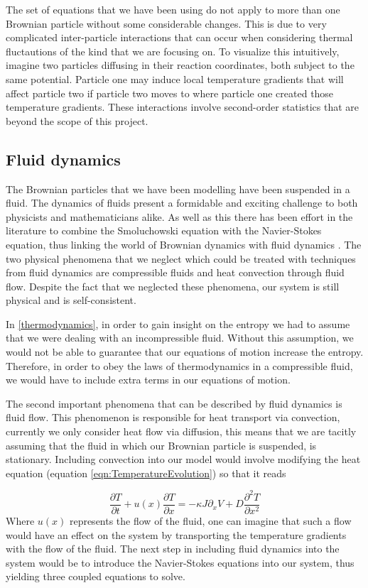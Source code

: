 The set of equations that we have been using do not apply to more than one Brownian particle without some considerable changes. This is due to very complicated inter-particle interactions that can occur when considering thermal fluctautions of the kind that we are focusing on. To visualize this intuitively, imagine two particles diffusing in their reaction coordinates, both subject to the same potential. Particle one may induce local temperature gradients that will affect particle two if particle two moves to where particle one created those temperature gradients. These interactions involve second-order statistics that are beyond the scope of this project.

\subsection{Fluid dynamics} \label{fluidDynamics}
The Brownian particles that we have been modelling have been suspended in a fluid. The dynamics of fluids present a formidable and exciting challenge to both physicists and mathematicians alike. As well as this there has been effort in the literature to combine the Smoluchowski equation with the Navier-Stokes equation, thus linking the world of Brownian dynamics with fluid dynamics \cite{Constantin2007}. The two physical phenomena that we neglect which could be treated with techniques from fluid dynamics are compressible fluids and heat convection through fluid flow. Despite the fact that we neglected these phenomena, our system is still physical and is self-consistent.

In \autoref{thermodynamics}, in order to gain insight on the entropy we had to assume that we were dealing with an incompressible fluid. Without this assumption, we would not be able to guarantee that our equations of motion
increase the entropy. Therefore, in order to obey the laws of thermodynamics in a compressible fluid, we would have to include extra terms in our equations of motion.

The second important phenomena that can be described by fluid dynamics is fluid flow. This phenomenon is responsible for heat transport via convection, currently we only consider heat flow via diffusion, this means that we are tacitly assuming that the fluid in which our Brownian particle is suspended, is stationary. Including convection into our model would involve modifying the heat equation (equation \ref{eqn:TemperatureEvolution}) so that it reads

\begin{equation}
\frac{\partial T}{\partial t} + u(x) \frac{\partial T}{\partial x} = -\kappa J \partial_x V + D \frac{\partial^2 T}{\partial x^2} 
\end{equation}
Where $u(x)$ represents the flow of the fluid, one can imagine that such a flow would have an effect on the system by transporting the temperature gradients with the flow of the fluid. The next step in including fluid dynamics into the system would be to introduce the Navier-Stokes equations into our system, thus yielding three coupled equations to solve.

